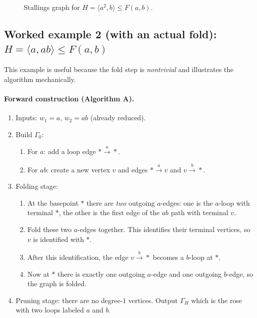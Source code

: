 \documentclass[11pt]{article}
\theoremstyle{definition}
\theoremstyle{plain}
\theoremstyle{remark}
\begin{document}
\begin{figure}[h]
\centering
{}
\caption{Stallings graph for $H=\langle a^2,b\rangle\le F(a,b)$.}
\end{figure}

\subsection*{Worked example 2 (with an actual fold): $H=\langle a,ab\rangle\le F(a,b)$}
This example is useful because the fold step is \emph{nontrivial} and illustrates the algorithm mechanically.

\paragraph{Forward construction (Algorithm A).}
\begin{enumerate}[leftmargin=2.2em]
\item Inputs: $w_1=a$, $w_2=ab$ (already reduced).
\item Build $\Gamma_0$:
\begin{enumerate}[leftmargin=2em]
\item For $a$: add a loop edge $*\xrightarrow{a}*$.
\item For $ab$: create a new vertex $v$ and edges $*\xrightarrow{a}v$ and $v\xrightarrow{b}*$.
\end{enumerate}
\item Folding stage:
\begin{enumerate}[leftmargin=2em]
\item At the basepoint $*$ there are \emph{two} outgoing $a$-edges:
one is the $a$-loop with terminal $*$, the other is the first edge of the $ab$ path with terminal $v$.
\item Fold these two $a$-edges together. This identifies their terminal vertices, so $v$ is identified with $*$.
\item After this identification, the edge $v\xrightarrow{b}*$ becomes a $b$-loop at $*$.
\item Now at $*$ there is exactly one outgoing $a$-edge and one outgoing $b$-edge, so the graph is folded.
\end{enumerate}
\item Pruning stage: there are no degree-$1$ vertices. Output $\Gamma_H$ which is the rose with two loops labeled $a$ and $b$.
\end{enumerate}
\end{document}
